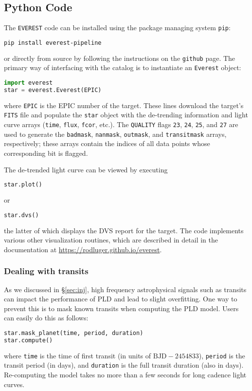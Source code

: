 \documentclass[]{aastex62}
\newenvironment{edits}{\color{red}}{\color{black}}
\begin{document}
\begin{edits}
\subsection{Python Code}
\label{sec:python}
The \texttt{EVEREST} code can be installed using the package managing system \texttt{pip}:
%
\begin{lstlisting}[language=bash]
pip install everest-pipeline
\end{lstlisting}
%
or directly from source by following the instructions on the \texttt{github} page.
The primary way of interfacing
with the catalog is to instantiate an \texttt{Everest} object:
%
\begin{lstlisting}[language=Python]
import everest
star = everest.Everest(EPIC)
\end{lstlisting}
%
where \texttt{EPIC} is the EPIC number of the target. These lines download the
target's \texttt{FITS} file and populate
the \texttt{star} object with the de-trending information and light curve arrays
(\texttt{time}, \texttt{flux}, \texttt{fcor}, etc.).
The \texttt{QUALITY} flags \texttt{23}, \texttt{24}, \texttt{25}, and \texttt{27} are
used to generate the \texttt{badmask}, \texttt{nanmask}, \texttt{outmask}, and
\texttt{transitmask} arrays, respectively; these arrays contain the indices of all
data points whose corresponding bit is flagged.

The de-trended light curve can be viewed by executing
%
\begin{lstlisting}[language=Python]
star.plot()
\end{lstlisting}
%
or
%
\begin{lstlisting}[language=Python]
star.dvs()
\end{lstlisting}
%
the latter of which displays the DVS report for the target.
The code implements various other visualization routines, which are described in
detail in the documentation at \url{https://rodluger.github.io/everest}.

\subsubsection{Dealing with transits}
\label{sec:dealing_with_transits}
As we discussed in \S\ref{sec:inj}, high frequency astrophysical signals such
as transits can impact the performance of PLD and lead to slight overfitting.
One way to prevent this is to mask known transits when computing the PLD
model. Users can easily do this as follows:
%
\begin{lstlisting}[language=Python]
star.mask_planet(time, period, duration)
star.compute()
\end{lstlisting}
%
where \texttt{time} is the time of first transit (in units of $\mathrm{BJD} - 2454833$),
\texttt{period} is the transit period (in days), and \texttt{duration} is the full
transit duration (also in days). Re-computing the model takes no more than
a few seconds for long cadence light curves.


\end{edits}
\end{document}
